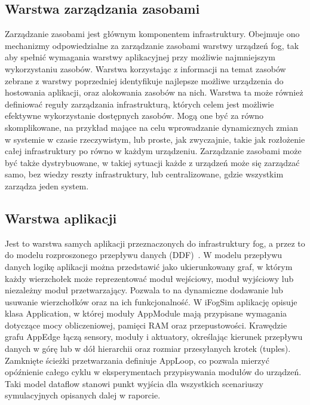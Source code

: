\documentclass[
    oneside,            %
    left=2.5cm,         %
    right=2.5cm,        %
    top=2.5cm,          %
    bottom=3cm,         %
    bindingoffset=6mm,  %
    nohyphenation=false %
]{eiti/eiti-report}
\begin{document}
\subsection{Warstwa zarządzania zasobami}
Zarządzanie zasobami jest głównym komponentem infrastruktury. Obejmuje ono mechanizmy odpowiedzialne za zarządzanie zasobami warstwy urządzeń fog, tak aby spełnić wymagania warstwy aplikacyjnej przy możliwie najmniejszym wykorzystaniu zasobów. 
Warstwa korzystając z informacji na temat zasobów zebrane z warstwy poprzedniej identyfikuje najlepsze możliwe urządzenia do hostowania aplikacji, oraz alokowania zasobów na nich. Warstwa ta może również definiować reguły zarządzania infrastrukturą, których celem jest możliwie efektywne wykorzystanie dostępnych zasobów. Mogą one być za równo skomplikowane, na przykład mające na celu wprowadzanie dynamicznych zmian w systemie w czasie rzeczywistym, lub proste, jak zwyczajnie, takie jak rozłożenie całej infrastruktury po równo w każdym urządzeniu.
Zarządzanie zasobami może być także dystrybuowane, w takiej sytuacji każde z urządzeń może się zarządzać samo, bez wiedzy reszty infrastruktury, lub centralizowane, gdzie wszystkim zarządza jeden system.

\subsection{Warstwa aplikacji}
Jest to warstwa samych aplikacji przeznaczonych do infrastruktury fog, a przez to do modelu rozproszonego przepływu danych (DDF)~\cite{DDF}. W modelu przepływu danych logikę aplikacji można przedstawić jako ukierunkowany graf, w którym każdy wierzchołek może reprezentować moduł wejściowy, moduł wyjściowy lub niezależny moduł przetwarzający. Pozwala to na dynamiczne dodawanie lub usuwanie wierzchołków oraz na ich funkcjonalność.
W iFogSim aplikację opisuje klasa Application, w której moduły AppModule mają przypisane wymagania dotyczące mocy obliczeniowej, pamięci RAM oraz przepustowości. Krawędzie grafu AppEdge łączą sensory, moduły i aktuatory, określając kierunek przepływu danych w górę lub w dół hierarchii oraz rozmiar przesyłanych krotek (tuples). Zamknięte ścieżki przetwarzania definiuje AppLoop, co pozwala mierzyć opóźnienie całego cyklu w eksperymentach przypisywania modułów do urządzeń.
Taki model dataflow stanowi punkt wyjścia dla wszystkich scenariuszy symulacyjnych opisanych dalej w raporcie.
\end{document}
